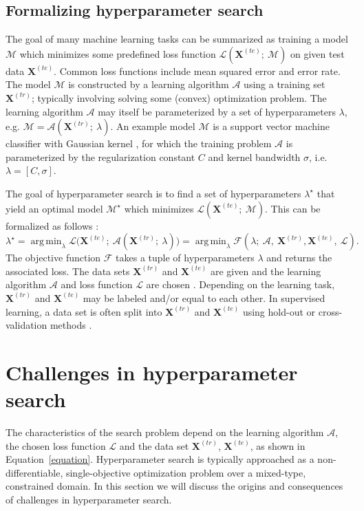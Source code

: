 \documentclass{mic2015}
\newcommand{\train}{\mathbf{X}^{(tr)}}
\newcommand{\test}{\mathbf{X}^{(te)}}
\newcommand{\obj}{\mathcal{F}}
\DeclareMathOperator*{\argmin}{arg\,min}
\begin{document}
\subsection{Formalizing hyperparameter search}
The goal of many machine learning tasks can be summarized as training a model $\mathcal{M}$ which minimizes some predefined loss function $\mathcal{L}(\test;\ \mathcal{M})$ on given test data $\test$. Common loss functions include mean squared error and error rate. The model $\mathcal{M}$ is constructed by a learning algorithm $\mathcal{A}$ using a training set $\train$; typically involving solving some (convex) optimization problem. The learning algorithm $\mathcal{A}$ may itself be parameterized by a set of hyperparameters $\lambda$, e.g. $\mathcal{M} = \mathcal{A}(\train;\ \lambda)$. An example model $\mathcal{M}$ is a support vector machine classifier with Gaussian kernel \citep{scholkopf2002learning}, for which the training problem $\mathcal{A}$ is parameterized by the regularization constant $C$ and kernel bandwidth $\sigma$, i.e. $\lambda = [C,\sigma]$.

The goal of hyperparameter search is to find a set of hyperparameters $\lambda^\star$ that yield an optimal model $\mathcal{M}^\star$ which minimizes $\mathcal{L}(\test;\ \mathcal{M})$. This can be formalized as follows \citep{DBLP:journals/corr/ClaesenSPMM14}:
\begin{equation}
\lambda^\star = \argmin_{\lambda} \mathcal{L}\big(\test;\ \mathcal{A}(\train;\ \lambda)\big) = \argmin_{\lambda} \obj(\lambda;\ \mathcal{A},\ \train, \test,\ \mathcal{L}). \label{equation}
\end{equation}
The objective function $\obj$ takes a tuple of hyperparameters $\lambda$ and returns the associated loss. The data sets $\train$ and $\test$ are given and the learning algorithm $\mathcal{A}$ and loss function $\mathcal{L}$ are chosen . Depending on the learning task, $\train$ and $\test$ may be labeled and/or equal to each other. In supervised learning, a data set is often split into $\train$ and $\test$ using hold-out or cross-validation methods \citep{efron1983leisurely,kohavi1995study}.



\section{Challenges in hyperparameter search} \label{challenges}
The characteristics of the search problem depend on the learning algorithm $\mathcal{A}$, the chosen loss function $\mathcal{L}$ and the data set $\train$, $\test$, as shown in Equation~\eqref{equation}. Hyperparameter search is typically approached as a non-differentiable, single-objective optimization problem over a mixed-type, constrained domain. In this section we will discuss the origins and consequences of challenges in hyperparameter search.
\end{document}

